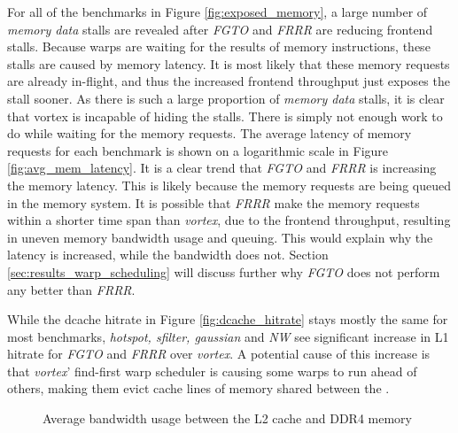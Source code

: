 For all of the benchmarks in Figure \ref{fig:exposed_memory}, a large number of \textit{memory data} stalls are revealed after \textit{FGTO} and \textit{FRRR} are reducing frontend stalls. Because warps are waiting for the results of memory instructions, these stalls are caused by memory latency. It is most likely that these memory requests are already in-flight, and thus the increased frontend throughput just exposes the stall sooner. As there is such a large proportion of \textit{memory data} stalls, it is clear that \Gls{vortex} is incapable of hiding the stalls. There is simply not enough  work to do while waiting for the memory requests. The average latency of memory requests for each benchmark is shown on a logarithmic scale in Figure \ref{fig:avg_mem_latency}. It is a clear trend that \textit{FGTO} and \textit{FRRR} is increasing the memory latency. This is likely because the memory requests are being queued in the memory system. It is possible that \textit{FRRR} make the memory requests within a shorter time span than \textit{\Gls{vortex}}, due to the frontend throughput, resulting in uneven memory bandwidth usage and queuing. This would explain why the latency is increased, while the bandwidth does not. Section \ref{sec:results_warp_scheduling} will discuss further why \textit{FGTO} does not perform any better than \textit{FRRR}.

While the dcache hitrate in Figure \ref{fig:dcache_hitrate} stays mostly the same for most benchmarks, \textit{hotspot, sfilter, gaussian} and \textit{NW} see significant increase in L1 hitrate for \textit{FGTO} and \textit{FRRR} over \textit{\Gls{vortex}}. A potential cause of this increase is that \textit{\Gls{vortex}}' find-first warp scheduler is causing some warps to run ahead of others, making them evict cache lines of memory shared between the . 

\begin{figure}
    \centering
    \caption[Average bandwidth usage between the L2 cache and main memory.]{Average bandwidth usage between the L2 cache and DDR4 memory}
    \label{fig:bandwidth_usage_l2}
\end{figure}

